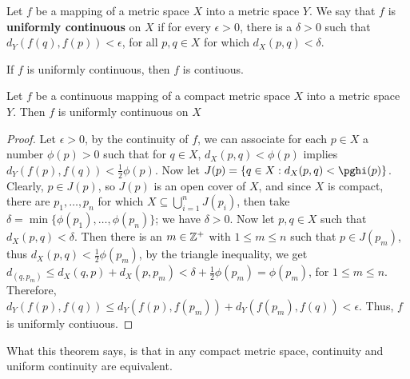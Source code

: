 \begin{definition}
    Let $f$ be a mapping of a metric space  $X$ into a metric space $Y$. We say that  $f$ is
    \textbf{uniformly continuous} on $X$ if for every  $\epsilon>0$, there is a  $\delta>0$ such that
    $d_Y(f(q),f(p))<\epsilon$, for all  $p,q \in X$ for which  $d_X(p,q)<\delta$.
\end{definition}

\begin{lemma}\label{5.3.5}
    If $f$ is uniformly continuous, then  $f$ is contiuous.
\end{lemma}

\begin{theorem}\label{5.3.6}
    Let $f$ be a continuous mapping of a compact metric space $X$ into a metric space $Y$.
    Then  $f$ is uniformly continuous on  $X$
\end{theorem}
\begin{proof}
    Let $\epsilon>0$, by the continuity of  $f$, we can associate for each  $p \in X$ a number
    $\phi(p)>0$ such that  for $q \in X$,  $d_X(p,q)<\phi(p)$ implies $d_Y(f(p),f(q))<\frac{1}{2}\phi(p)$.
    Now let $J(p)=\{q \in X:d_X(p,q)<\pghi(p)\}$. Clearly,  $p \in J(p)$, so  $J(p)$ is
    an open cover of  $X$, and since  $X$ is compact, there are  $p_1, \dots, p_n$ for which
    $X \subseteq \bigcup_{i=1}^{n}{J(p_i)}$, then take  $\delta=\min\{\phi(p_1), \dots, \phi(p_n)\}$; we have
    $\delta>0$. Now let  $p,q \in X$ such that  $d_X(p,q)<\delta$. Then  there is an $m \in \mathbb{Z}^+$
    with  $1 \leq m \leq n$ such that  $p \in J(p_m)$, thus  $d_X(p,q)<\frac{1}{2}\phi(p_m)$,
    by the triangle inequality, we get $d_(q,p_m) \leq d_X(q,p)+d_X(p,p_m)<\delta+\frac{1}{2}\phi(p_m)=\phi(p_m)$,
    for $1 \leq m \leq n$. Therefore,  $d_Y(f(p),f(q)) \leq d_Y(f(p),f(p_m))+d_Y(f(p_m),f(q))<\epsilon$.
    Thus,  $f$ is uniformly contiuous.
\end{proof}

\begin{remark}
    What this theorem says, is that in any compact metric space, continuity and uniform
    continuity are equivalent.
\end{remark}

